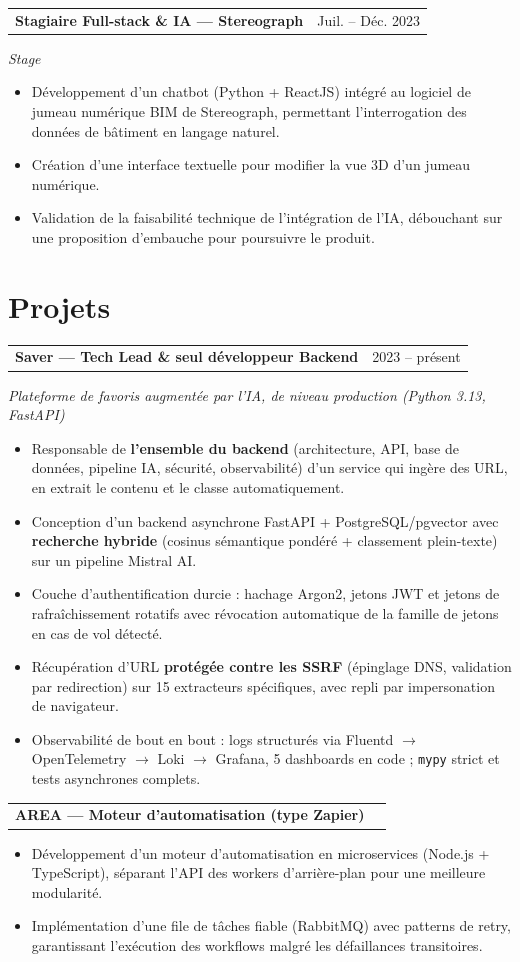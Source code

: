 \documentclass[10pt,a4paper]{article}
\makeatletter
\newcommand{\entry}[2]{%
  \vspace{1pt}\noindent\begin{tabular*}{\textwidth}{@{}l@{\extracolsep{\fill}}r@{}}
  \textbf{#1} & #2 \\
  \end{tabular*}\par}
\newcommand{\subentry}[1]{\noindent\textit{#1}\par\vspace{1pt}}
\makeatother
\begin{document}
\entry{Stagiaire Full-stack \& IA --- Stereograph}{Juil. -- Déc. 2023}
\subentry{Stage}
\begin{itemize}
  \item Développement d'un chatbot (Python + ReactJS) intégré au logiciel de jumeau numérique BIM de Stereograph, permettant l'interrogation des données de bâtiment en langage naturel.
  \item Création d'une interface textuelle pour modifier la vue 3D d'un jumeau numérique.
  \item Validation de la faisabilité technique de l'intégration de l'IA, débouchant sur une proposition d'embauche pour poursuivre le produit.
\end{itemize}

\section{Projets}

\entry{Saver --- Tech Lead \& seul développeur Backend}{2023 -- présent}
\subentry{Plateforme de favoris augmentée par l'IA, de niveau production (Python 3.13, FastAPI)}
\begin{itemize}
  \item Responsable de \textbf{l'ensemble du backend} (architecture, API, base de données, pipeline IA, sécurité, observabilité) d'un service qui ingère des URL, en extrait le contenu et le classe automatiquement.
  \item Conception d'un backend asynchrone FastAPI + PostgreSQL/pgvector avec \textbf{recherche hybride} (cosinus sémantique pondéré + classement plein-texte) sur un pipeline Mistral AI.
  \item Couche d'authentification durcie : hachage Argon2, jetons JWT et jetons de rafraîchissement rotatifs avec révocation automatique de la famille de jetons en cas de vol détecté.
  \item Récupération d'URL \textbf{protégée contre les SSRF} (épinglage DNS, validation par redirection) sur 15 extracteurs spécifiques, avec repli par impersonation de navigateur.
  \item Observabilité de bout en bout : logs structurés via Fluentd $\rightarrow$ OpenTelemetry $\rightarrow$ Loki $\rightarrow$ Grafana, 5 dashboards en code ; \texttt{mypy} strict et tests asynchrones complets.
\end{itemize}

\entry{AREA --- Moteur d'automatisation (type Zapier)}{}
\begin{itemize}
  \item Développement d'un moteur d'automatisation en microservices (Node.js + TypeScript), séparant l'API des workers d'arrière-plan pour une meilleure modularité.
  \item Implémentation d'une file de tâches fiable (RabbitMQ) avec patterns de retry, garantissant l'exécution des workflows malgré les défaillances transitoires.
\end{itemize}
\end{document}
